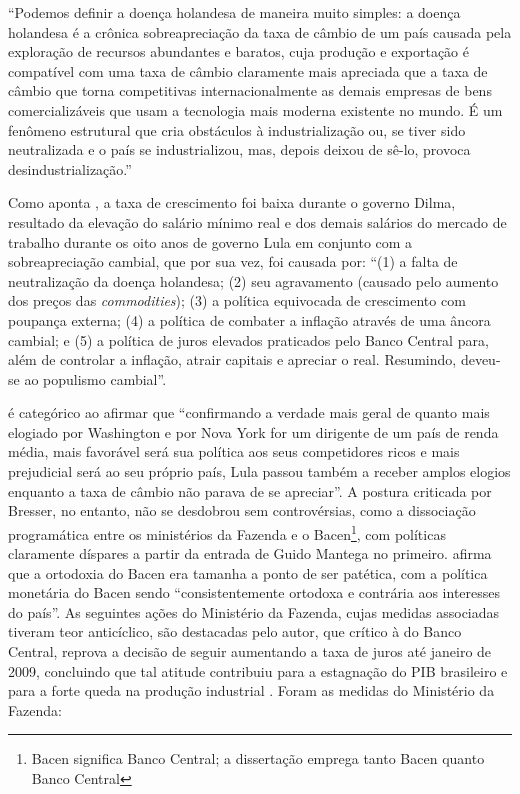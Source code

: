 	\begin{citacao}
		``Podemos definir a doença holandesa de maneira muito simples: a doença holandesa é a crônica sobreapreciação da taxa de câmbio de um país causada pela exploração de recursos abundantes e baratos, cuja produção e exportação é compatível com uma taxa de câmbio claramente mais apreciada que a taxa de câmbio que torna competitivas internacionalmente as demais empresas de bens comercializáveis que usam a tecnologia mais moderna existente no mundo. É um fenômeno estrutural que cria obstáculos à industrialização ou, se tiver sido neutralizada e o país se industrializou, mas, depois deixou de sê-lo, provoca desindustrialização.'' \cite[p. 3]{Bresser2009}
	\end{citacao}
	
	Como aponta , a taxa de crescimento foi baixa durante o governo Dilma, resultado da elevação do salário mínimo real e dos demais salários do mercado de trabalho durante os oito anos de governo Lula em conjunto com a sobreapreciação cambial, que por sua vez, foi causada por: ``(1) a falta de neutralização da doença holandesa; (2) seu agravamento (causado pelo aumento dos preços das \textit{commodities}); (3) a política equivocada de crescimento com poupança externa; (4) a política de combater a inflação através de uma âncora cambial; e (5) a política de juros elevados praticados pelo Banco Central para, além de controlar a inflação, atrair capitais e apreciar o real. Resumindo, deveu-se ao populismo cambial''.
	
	 é categórico ao afirmar que ``confirmando a verdade mais geral de quanto mais elogiado por Washington e por Nova York for um dirigente de um país de renda média, mais favorável será sua política aos seus competidores ricos e mais prejudicial será ao seu próprio país, Lula passou também a receber amplos elogios enquanto a taxa de câmbio não parava de se apreciar''. A postura criticada por Bresser, no entanto, não se desdobrou sem controvérsias, como a dissociação programática entre os ministérios da Fazenda e o Bacen\footnote{Bacen significa Banco Central; a dissertação emprega tanto Bacen quanto Banco Central}, com políticas claramente díspares a partir da entrada de Guido Mantega no primeiro.  afirma que a ortodoxia do Bacen era tamanha a ponto de ser patética, com a política monetária do Bacen sendo ``consistentemente ortodoxa e contrária aos interesses do país''. As seguintes ações do Ministério da Fazenda, cujas medidas associadas tiveram teor anticíclico, são destacadas pelo autor, que crítico à do Banco Central, reprova a decisão de seguir aumentando a taxa de juros até janeiro de 2009, concluindo que tal atitude contribuiu para a estagnação do PIB brasileiro e para a forte queda na produção industrial \cite[p. 352]{Bresser2016}.	Foram as medidas do Ministério da Fazenda: 

